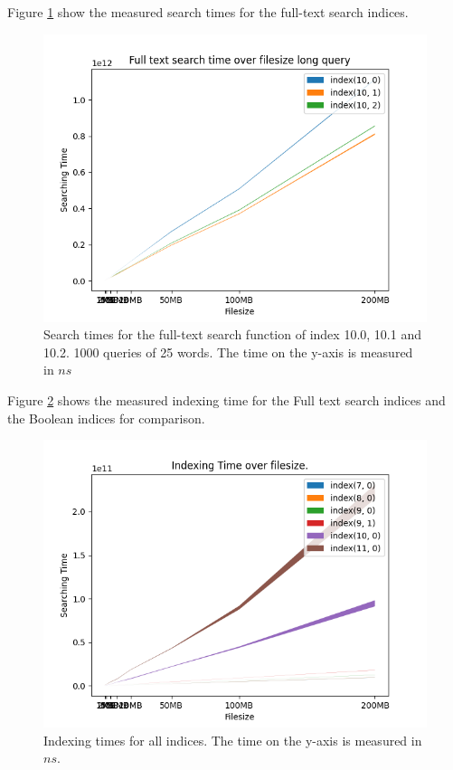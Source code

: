 Figure \ref{fig:Searchtimefulltext10long} show the measured search times for the full-text search indices.

\begin{figure}[ht!]
    \centering
    \includegraphics[width=.8\textwidth]{LaTeX/Pictures/Results/Fulltexlong[(10, 0), (10, 1), (10, 2)].png}
    \caption{Search times for the full-text search function of index 10.0, 10.1 and 10.2. 1000 queries of 25 words. The time on the y-axis is measured in $ns$}
    \label{fig:Searchtimefulltext10long}
\end{figure}

Figure \ref{fig:IndexingAll} shows the measured indexing time for the Full text search indices and the Boolean indices for comparison.

\begin{figure}[ht!]
    \centering
    \includegraphics[width=.8\textwidth]{LaTeX/Pictures/Results/Indexing[(7, 0), (8, 0), (9, 0), (9, 1), (10, 0), (11, 0)].png}
    \caption{Indexing times for all indices. The time on the y-axis is measured in $ns$.}
    \label{fig:IndexingAll}
\end{figure}